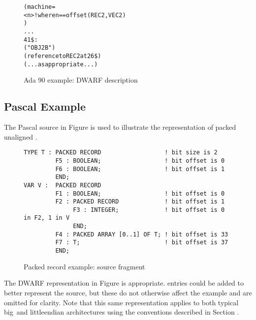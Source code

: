 \begin{figure}[p]
\begin{dwflisting}
\begin{alltt}
            (machine=
                <n> ! where n == offset(REC2, VEC2)
                )
     . . .
41\$: 
        ("OBJ2B")
        (reference to REC2 at 26\$)
        (...as appropriate...)
\end{alltt}
\end{dwflisting}
\caption{Ada 90 example: DWARF description}
\label{fig:adaexampledwarfdescription}
\end{figure}

\clearpage

\subsection{Pascal Example}
\label{app:pascalexample}
The Pascal  source in 
Figure 
is used to illustrate the representation of packed unaligned
.

\begin{figure}[here]
\begin{lstlisting}
TYPE T : PACKED RECORD                  ! bit size is 2
         F5 : BOOLEAN;                  ! bit offset is 0
         F6 : BOOLEAN;                  ! bit offset is 1
         END;
VAR V :  PACKED RECORD
         F1 : BOOLEAN;                  ! bit offset is 0
         F2 : PACKED RECORD             ! bit offset is 1
              F3 : INTEGER;             ! bit offset is 0 in F2, 1 in V
              END;
         F4 : PACKED ARRAY [0..1] OF T; ! bit offset is 33
         F7 : T;                        ! bit offset is 37
         END;
\end{lstlisting}
\caption{Packed record example: source fragment}
\label{fig:packedrecordexamplesourcefragment}
\end{figure}

The DWARF representation in 
Figure  
is appropriate. 
 entries could be added to
better represent the source, but these do not otherwise affect
the example and are omitted for clarity. Note that this same
representation applies to both typical big\dash \ and 
little\dash endian
architectures using the conventions described in 
Section .

